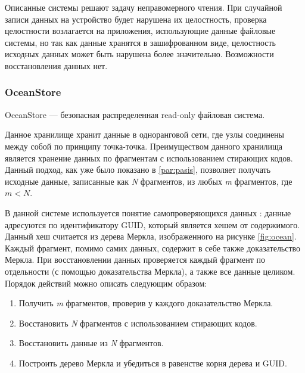 Описанные системы решают задачу неправомерного чтения. При случайной записи данных на устройство будет нарушена их целостность, проверка целостности возлагается на приложения, использующие данные файловые системы, но так как данные хранятся в зашифрованном виде, целостность исходных данных может быть нарушена более значительно. Возможности восстановления данных нет.

\subsubsection{OceanStore}
\label{par:ocean}

OceanStore \cite{ocean} --- безопасная распределенная read-only файловая система.

Данное хранилище хранит данные в одноранговой сети, где узлы соединены между собой по принципу точка-точка. Преимуществом данного хранилища является хранение данных по фрагментам с использованием стирающих кодов. Данный подход, как уже было показано в \ref{par:pasis}, позволяет получать исходные данные, записанные как \textit{N} фрагментов, из любых \textit{m} фрагментов, где $m < N$.

В данной системе используется понятие самопроверяющихся данных \cite{selfverify}: данные адресуются по идентификатору GUID, который является хешем от содержимого. Данный хеш считается из дерева Меркла, изображенного на рисунке \ref{fig:ocean}. Каждый фрагмент, помимо самих данных, содержит в себе также доказательство Меркла. При восстановлении данных проверяется каждый фрагмент по отдельности (с помощью доказательства Меркла), а также все данные целиком. Порядок действий можно описать следующим образом:
\begin{enumerate}
	\item Получить \textit{m} фрагментов, проверив у каждого доказательство Меркла.
	\item Восстановить \textit{N} фрагментов с использованием стирающих кодов.
	\item Восстановить данные из \textit{N} фрагментов. %
	\item Построить дерево Меркла и убедиться в равенстве корня дерева и GUID.
\end{enumerate}

